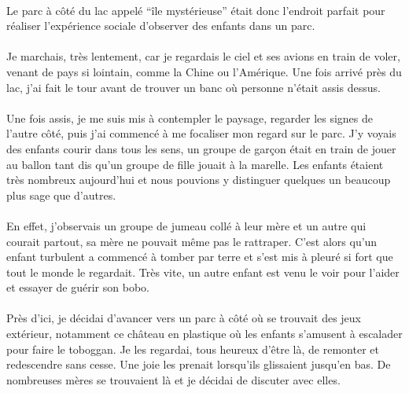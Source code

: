 \paragraph{} Le parc à côté du lac appelé ``île mystérieuse'' était donc
l'endroit parfait pour réaliser l'expérience sociale d'observer des enfants
dans un parc.

\paragraph{} Je marchais, très lentement, car je regardais le ciel et ses
avions en train de voler, venant de pays si lointain, comme la Chine ou
l'Amérique. Une fois arrivé près du lac, j'ai fait le tour avant de trouver un
banc où personne n'était assis dessus.

\paragraph{} Une fois assis, je me suis mis à contempler le paysage, regarder
les signes de l'autre côté, puis j'ai commencé à me focaliser mon regard sur le
parc. J'y voyais des enfants courir dans tous les sens, un groupe de garçon
était en train de jouer au ballon tant dis qu'un groupe de fille jouait à la
marelle. Les enfants étaient très nombreux aujourd'hui et nous pouvions y
distinguer quelques un beaucoup plus sage que d'autres.

\paragraph{} En effet, j'observais un groupe de jumeau collé à leur mère et un
autre qui courait partout, sa mère ne pouvait même pas le rattraper. C'est
alors qu'un enfant turbulent a commencé à tomber par terre et s'est mis à
pleuré si fort que tout le monde le regardait. Très vite, un autre enfant est
venu le voir pour l'aider et essayer de guérir son bobo.

\paragraph{} Près d'ici, je décidai d'avancer vers un parc à côté où se
trouvait des jeux extérieur, notamment ce château en plastique où les enfants
s'amusent à escalader pour faire le toboggan. Je les regardai, tous heureux
d'être là, de remonter et redescendre sans cesse. Une joie les prenait
lorsqu'ils glissaient jusqu'en bas. De nombreuses mères se trouvaient là et je
décidai de discuter avec elles.

